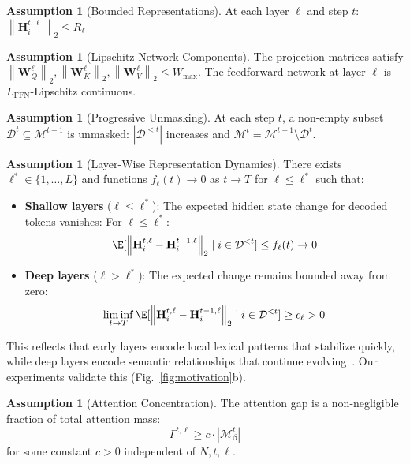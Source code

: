 \documentclass{article} %
\theoremstyle{definition}
\newtheorem{assumption}[theorem]{Assumption}
\theoremstyle{remark}
\newcommand{\norm}[1]{\left\|#1\right\|}
\begin{document}
\begin{assumption}[Bounded Representations]\label{ass:bounded}
At each layer $\ell$ and step $t$: $\norm{\mathbf{H}^{t,\ell}_i}_2 \leq R_\ell$
\end{assumption}

\begin{assumption}[Lipschitz Network Components]\label{ass:lipschitz}
The projection matrices satisfy $\norm{\mathbf{W}_Q^{\ell}}_2, \norm{\mathbf{W}_K^{\ell}}_2, \norm{\mathbf{W}_V^{\ell}}_2 \leq W_{\max}$. The feedforward network at layer $\ell$ is $L_{\text{FFN}}$-Lipschitz continuous.
\end{assumption}

\begin{assumption}[Progressive Unmasking]\label{ass:unmasking}
At each step $t$, a non-empty subset $\mathcal{D}^t \subseteq \mathcal{M}^{t-1}$ is unmasked: $|\mathcal{D}^{<t}|$ increases and $\mathcal{M}^t = \mathcal{M}^{t-1} \setminus \mathcal{D}^t$.
\end{assumption}

\begin{assumption}[Layer-Wise Representation Dynamics]\label{ass:specialization}
There exists $\ell^* \in \{1,\ldots,L\}$ and functions $f_{\ell}(t) \to 0$ as $t \to T$ for $\ell \leq \ell^*$ such that:
\begin{itemize}
\item \textbf{Shallow layers} ($\ell \leq \ell^*$): The expected hidden state change for decoded tokens vanishes: 
For $\ell \leq \ell^*$: $$\E[\norm{\mathbf{H}^{t,\ell}_i - \mathbf{H}^{t-1,\ell}_i}_2 \mid i \in \mathcal{D}^{<t}] \leq f_{\ell}(t) \to 0$$

\item \textbf{Deep layers} ($\ell > \ell^*$): The expected change remains bounded away from zero:
$$\liminf_{t \to T} \E[\norm{\mathbf{H}^{t,\ell}_i - \mathbf{H}^{t-1,\ell}_i}_2 \mid i \in \mathcal{D}^{<t}] \geq c_{\ell} > 0$$
\end{itemize}
This reflects that early layers encode local lexical patterns that stabilize quickly, while deep layers encode semantic relationships that continue evolving~\citep{kovaleva2019revealing,jawahar2019does,rogers2021primer}. Our experiments validate this (Fig.~\ref{fig:motivation}b).
\end{assumption}

\begin{assumption}[Attention Concentration]\label{attn_concentration}
The attention gap is a non-negligible fraction of total attention mass:
\begin{equation}
\Gamma^{t,\ell} \geq c \cdot |\mathcal{M}^t_\beta|
\end{equation}
for some constant $c > 0$ independent of $N, t, \ell$.
\end{assumption}
\end{document}
